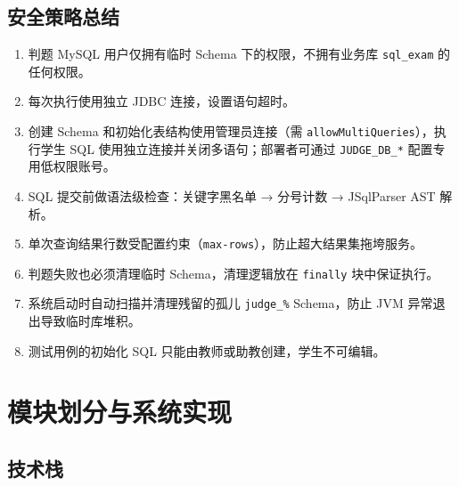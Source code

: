 \documentclass[12pt,a4paper]{ctexart}
\begin{document}
\subsection{安全策略总结}

\begin{enumerate}[leftmargin=2em]
  \item 判题 MySQL 用户仅拥有临时 Schema 下的权限，不拥有业务库 \texttt{sql\_exam} 的任何权限。
  \item 每次执行使用独立 JDBC 连接，设置语句超时。
  \item 创建 Schema 和初始化表结构使用管理员连接（需 \texttt{allowMultiQueries}），执行学生 SQL 使用独立连接并关闭多语句；部署者可通过 \texttt{JUDGE\_DB\_*} 配置专用低权限账号。
  \item SQL 提交前做语法级检查：关键字黑名单 → 分号计数 → JSqlParser AST 解析。
  \item 单次查询结果行数受配置约束（\texttt{max-rows}），防止超大结果集拖垮服务。
  \item 判题失败也必须清理临时 Schema，清理逻辑放在 \texttt{finally} 块中保证执行。
  \item 系统启动时自动扫描并清理残留的孤儿 \texttt{judge\_\%} Schema，防止 JVM 异常退出导致临时库堆积。
  \item 测试用例的初始化 SQL 只能由教师或助教创建，学生不可编辑。
\end{enumerate}

\section{模块划分与系统实现}

\subsection{技术栈}
\end{document}
